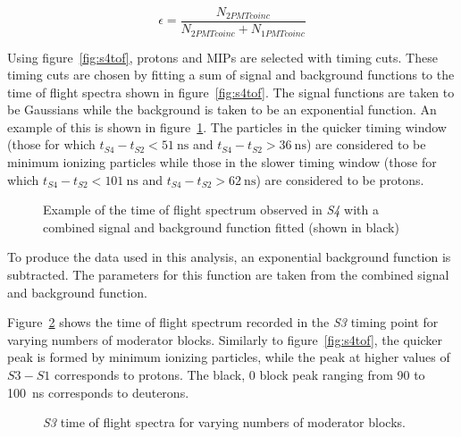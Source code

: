 \begin{equation}
  \epsilon = \frac{N_{2PMTcoinc}}{N_{2PMTcoinc}+N_{1PMTcoinc}}
  \label{eq:barEff}
\end{equation}

Using figure~\ref{fig:s4tof}, protons and MIPs are selected with timing cuts. 
These timing cuts are chosen by fitting a sum of signal and background functions to the time of flight spectra shown in figure~\ref{fig:s4tof}. 
The signal functions are taken to be Gaussians while the background is taken to be an exponential function. 
An example of this is shown in figure~\ref{fig:fitEx}.
The particles in the quicker timing window (those for which $t_{\mathit{S4}}-t_{\mathit{S2}}<51~\text{ns}$ and $t_{\mathit{S4}}-t_{\mathit{S2}}>36~\text{ns}$) are considered to be minimum ionizing particles while those in the slower timing window (those for which $t_{\mathit{S4}}-t_{\mathit{S2}}<101~\text{ns}$ and $t_{\mathit{S4}}-t_{\mathit{S2}}>62~\text{ns}$) are considered to be protons.

\begin{figure}[h]
  \begin{adjustbox}{max totalsize={.7\textwidth}{.62\textheight},center}
    
  \end{adjustbox}
  \caption{Example of the time of flight spectrum observed in \textit{S4} with a combined signal and background function fitted (shown in black)}
  \label{fig:fitEx}
\end{figure}

To produce the data used in this analysis, an exponential background function is subtracted. 
The parameters for this function are taken from the combined signal and background function.

Figure~\ref{fig:s3tof} shows the time of flight spectrum recorded in the \textit{S3} timing point for varying numbers of moderator blocks.
Similarly to figure~\ref{fig:s4tof}, the quicker peak is formed by minimum ionizing particles, while the peak at higher values of $\mathit{S3} - \mathit{S1}$ corresponds to protons.
The black, 0 block peak ranging from 90 to 100~ns corresponds to deuterons.
\begin{figure}[h]
  \begin{adjustbox}{max totalsize={.8\textwidth}{.5\textheight},center}
    
  \end{adjustbox}
  \caption{\textit{S3} time of flight spectra for varying numbers of moderator blocks.}
  \label{fig:s3tof}
\end{figure}


